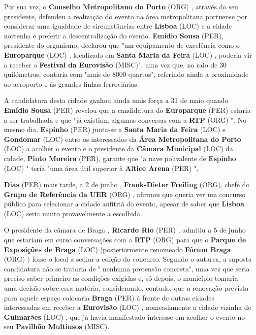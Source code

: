 \documentclass[12pt,a4paper]{article}
\begin{document}
Por sua vez, o \textbf{Conselho Metropolitano do Porto} (ORG) , através do seu presidente, defendeu a realização do evento na área metropolitana portuense por considerar uma igualdade de circunstâncias entre \textbf{Lisboa} (LOC) e a cidade nortenha e preferir a descentralização do evento. \textbf{Emídio Sousa} (PER), presidente do organismo, declarou que "um equipamento de excelência como o \textbf{Europarque} (LOC) , localizado em \textbf{Santa Maria da Feira} (LOC) , poderia vir a receber o \textbf{Festival da Eurovisão} (MISC)", uma vez que, no raio de 30 quilómetros, contaria com "mais de 8000 quartos", referindo ainda a proximidade ao aeroporto e às grandes linhas ferroviárias.

A candidatura desta cidade ganhou ainda mais força a 31 de maio quando \textbf{Emídio Sousa} (PER) revelou que a candidatura do \textbf{Europarque} (PER) estaria a ser trabalhada e que "já existiam algumas conversas com a \textbf{RTP} (ORG) ". No mesmo dia, \textbf{Espinho} (PER) junta-se a \textbf{Santa Maria da Feira} (LOC) e \textbf{Gondomar} (LOC) entre os interessados da \textbf{Área Metropolitana do Porto} (LOC) a acolher o evento e o presidente da \textbf{Câmara Municipal} (LOC) da cidade, \textbf{Pinto Moreira} (PER), garante que "a nave polivalente de \textbf{Espinho} (LOC) " teria "uma área útil superior à \textbf{Altice Arena} (PER) ".

\textbf{Dias} (PER) mais tarde, a 2 de junho , \textbf{Frank-Dieter Freiling} (ORG), chefe do \textbf{Grupo de Referência da UER} (ORG) , afirmou que queria ver um concurso público para selecionar a cidade anfitriã do evento, apesar de saber que \textbf{Lisboa} (LOC) seria muito provavelmente a escolhida.

O presidente da câmara de Braga , \textbf{Ricardo Rio} (PER) , admitiu a 5 de junho que estariam em curso conversações com a \textbf{RTP} (ORG) para que o \textbf{Parque de Exposições de Braga} (LOC) (posteriormente renomeado \textbf{Fórum Braga} (ORG) ) fosse o local a sediar a edição do concurso. Segundo o autarca, a suposta candidatura não se trataria de " nenhuma pretensão concreta", uma vez que seria preciso saber primeiro as condições exigidas e, só depois, o município tomaria uma decisão sobre essa matéria, considerando, contudo, que a renovação prevista para aquele espaço colocaria \textbf{Braga} (PER) à frente de outras cidades interessadas em receber a \textbf{Eurovisão} (LOC) , nomeadamente a cidade vizinha de \textbf{Guimarães} (LOC) , que já havia manifestado interesse em acolher o evento no seu \textbf{Pavilhão Multiusos} (MISC).
\end{document}
